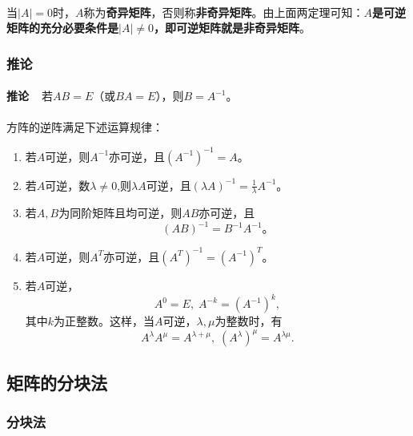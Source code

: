 \paragraph{}
当$|A|=0$时，$A$称为\textbf{奇异矩阵}，否则称\textbf{非奇异矩阵}。由上面两定理可知：\textbf{$A$是可逆矩阵的充分必要条件是$|A|\neq 0$，即可逆矩阵就是非奇异矩阵}。

\subsubsection{推论}
\paragraph{}
\textbf{推论~~}若$AB=E$（或$BA=E$），则$B=A^{-1}$。

\paragraph{}
方阵的逆阵满足下述运算规律：
\begin{enumerate}
  \item 若$A$可逆，则$A^{-1}$亦可逆，且$(A^{-1})^{-1} = A$。
  \item 若$A$可逆，数$\lambda\neq 0$,则$\lambda A$可逆，且$(\lambda A)^{-1} = \frac{1}{\lambda}A^{-1}$。
  \item 若$A,B$为同阶矩阵且均可逆，则$AB$亦可逆，且
  \begin{equation*}
    (AB)^{-1} = B^{-1}A^{-1}。
  \end{equation*}
  \item 若$A$可逆，则$A^T$亦可逆，且$(A^T)^{-1}=(A^{-1})^T$。
  \item 若$A$可逆，
  \begin{equation*}
    A^0 = E, \; A^{-k} = (A^{-1})^k,
  \end{equation*}
  其中$k$为正整数。这样，当$A$可逆，$\lambda, \mu$为整数时，有
  \begin{equation*}
    A^\lambda A^\mu = A^{\lambda + \mu}, \; (A^\lambda)^\mu = A^{\lambda\mu}.
  \end{equation*}
\end{enumerate}

\subsection{矩阵的分块法}
\subsubsection{分块法}
